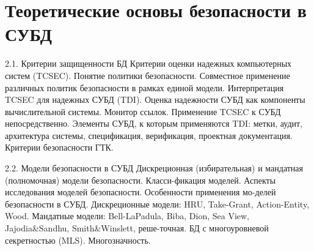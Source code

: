 \section{Теоретические основы безопасности в СУБД}

2.1. Критерии защищенности БД
Критерии оценки надежных компьютерных систем (TCSEC). Понятие политики безопасности. Совместное применение различных политик безопасности в рамках единой модели. Интерпретация TCSEC для надежных СУБД (TDI). Оценка надежности СУБД как компоненты вычислительной системы. Монитор ссылок. Применение TCSEC к СУБД непосредственно. Элементы СУБД, к которым применяются TDI: метки, аудит, архитектура системы, спецификация, верификация, проектная документация. Критерии безопасности ГТК.

2.2. Модели безопасности в СУБД
Дискреционная (избирательная) и мандатная (полномочная) модели безопасности. Класси-фикация моделей. Аспекты исследования моделей безопасности. Особенности применения мо-делей безопасности в СУБД. Дискреционные модели: HRU, Take-Grant, Action-Entity, Wood. Мандатные модели: Bell-LaPadula, Biba, Dion, Sea View, Jajodia\&Sandhu, Smith\&Winslett, реше-точная. БД с многоуровневой секретностью (MLS). Многозначность.